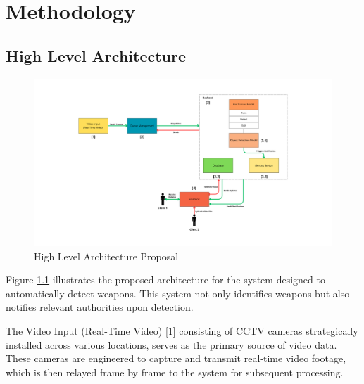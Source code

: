 \chapter{Methodology}
\label{chapter:architecture}

\newenvironment{architecture}
{\quote\itshape}
{\endquote}

\begin{architecture}
\end{architecture}

\section{High Level Architecture}
\begin{figure}[h]
    \centering 
    \includegraphics[width=\textwidth]{figs/architecture.png} 
    \caption{High Level Architecture Proposal}
    \label{fig:architecture-proposal}
\end{figure}

Figure \ref{fig:architecture-proposal} illustrates the proposed architecture for the system designed to automatically detect weapons. This system not only identifies weapons but also notifies relevant authorities upon detection. 

The Video Input (Real-Time Video) [1] consisting of CCTV cameras strategically installed across various locations, serves as the primary source of video data. These cameras are engineered to capture and transmit real-time video footage, which is then relayed frame by frame to the system for subsequent processing.

